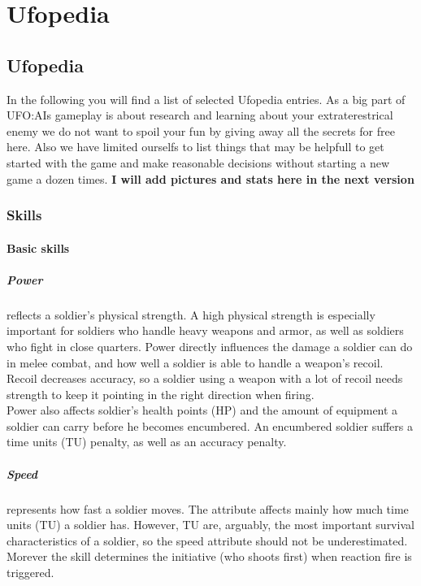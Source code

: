 
\chapter{Ufopedia}
\section{Ufopedia}
In the following you will find a list of selected Ufopedia entries. As a big part of UFO:AIs gameplay is about research and learning about your extraterestrical enemy we do not want to spoil your fun by giving away all the secrets for free here. Also we have limited ourselfs to list things that may be helpfull to get started with the game and make reasonable decisions without starting a new game a dozen times.
\textbf{I will add pictures and stats here in the next version}

\subsection{Skills}
\subsubsection{Basic skills}
\paragraph*{Power}
 reflects a soldier's physical strength. A high physical strength is especially important for soldiers who handle heavy weapons and armor, as well as soldiers who fight in close quarters. Power directly influences the damage a soldier can do in melee combat, and how well a soldier is able to handle a weapon's recoil. Recoil decreases accuracy, so a soldier using a weapon with a lot of recoil needs strength to keep it pointing in the right direction when firing.\\
Power also affects soldier's health points (HP) and the amount of equipment a soldier can carry before he becomes encumbered. An encumbered soldier suffers a time units (TU) penalty, as well as an accuracy penalty. 
\paragraph*{Speed}
 represents how fast a soldier moves. The attribute affects mainly how much time units (TU) a soldier has. However, TU are, arguably, the most important survival characteristics of a soldier, so the speed attribute should not be underestimated. Morever the skill determines the initiative (who shoots first) when reaction fire is triggered.
